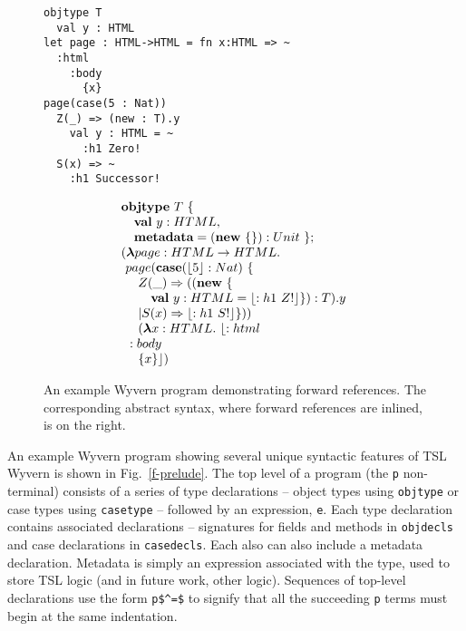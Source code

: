 \begin{figure}[t]
\begin{minipage}[t]{.54\textwidth}
\begin{lstlisting}
objtype T
  val y : HTML
let page : HTML->HTML = fn x:HTML => ~
  :html
    :body
      {x}
page(case(5 : Nat))
  Z(_) => (new : T).y
    val y : HTML = ~
      :h1 Zero!
  S(x) => ~
    :h1 Successor!
\end{lstlisting}
\end{minipage}%
\begin{minipage}[t]{.45\textwidth}
 \centering
\[
\begin{array}{l}
\textbf{objtype} \ T\ \{ \\
  ~~~\textbf{val}\ y : HTML, \\
  ~~~\textbf{metadata} = (\textbf{new}\ \{\}) : Unit\ \}; \\
  (\boldsymbol\lambda page : HTML \rightarrow HTML.\\
  ~page(\textbf{case}(\lfloor 5 \rfloor : Nat)\ \{ \\
  ~~~~Z(\_) \Rightarrow ((\textbf{new}\ \{ \\
    ~~~~~~~\textbf{val}\ y : HTML = \lfloor :h1\ Z! \rfloor\}) : T).y\ \\
   ~~~~| S(x) \Rightarrow \lfloor :h1\ S! \rfloor\})) \\
  ~~~~(\boldsymbol\lambda x : HTML.\ \lfloor :html \\
    ~~:body \\
      ~~~~\{x\} \rfloor)
\end{array}
\]
\end{minipage}
\caption{An example Wyvern program demonstrating forward references. The corresponding abstract syntax, where forward references are inlined, is on the right.}
\label{fig:fwd-ref}
\end{figure}
An example Wyvern program showing several unique syntactic features of TSL Wyvern is shown in Fig.~\ref{f-prelude}. The top level of a program (the \lstinline{p} non-terminal) consists of a series of type declarations -- object types using \lstinline{objtype} or case types using \lstinline{casetype} -- followed by an expression, \lstinline{e}. Each type declaration contains associated declarations -- signatures for fields and methods in  \lstinline{objdecls} and case declarations in \lstinline{casedecls}. Each also can also include a metadata declaration. Metadata is simply an expression associated with the type, used to store TSL logic (and in future work, other logic). Sequences of top-level declarations use the form \lstinline{p$^=$} to signify that all the succeeding \lstinline{p} terms must begin at the same indentation.

